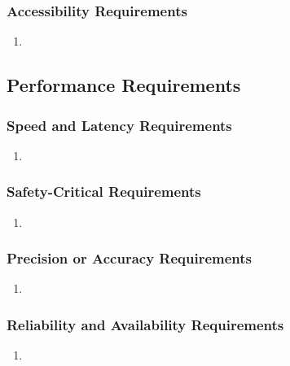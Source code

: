 \documentclass[]{article}
\begin{document}
\subsubsection{Accessibility Requirements}
\label{ssub:accessibility_requirements}
\begin{enumerate}[{UH}1. ]
	\item 
\end{enumerate}


\subsection{Performance Requirements}
\label{sub:performance_requirements}

\subsubsection{Speed and Latency Requirements}
\label{ssub:speed_and_latency_requirements}
\begin{enumerate}[{PR}1. ]
	\item 
\end{enumerate}

\subsubsection{Safety-Critical Requirements}
\label{ssub:safety_critical_requirements}
\begin{enumerate}[{PR}1. ]
	\item 
\end{enumerate}

\subsubsection{Precision or Accuracy Requirements}
\label{ssub:precision_or_accuracy_requirements}
\begin{enumerate}[{PR}1. ]
	\item 
\end{enumerate}

\subsubsection{Reliability and Availability Requirements}
\label{ssub:reliability_and_availability_requirements}
\begin{enumerate}[{PR}1. ]
	\item 
\end{enumerate}
\end{document}
